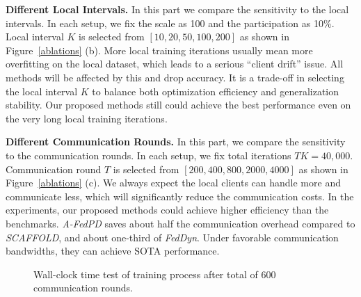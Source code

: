 \textbf{Different Local Intervals.} In this part we compare the sensitivity to the local intervals. In each setup, we fix the scale as 100 and the participation as 10\%. Local interval $K$ is selected from $\left[10, 20, 50, 100, 200\right]$ as shown in Figure~\ref{ablations} (b). More local training iterations usually mean more overfitting on the local dataset, which leads to a serious ``client drift'' issue. All methods will be affected by this and drop accuracy. It is a trade-off in selecting the local interval $K$ to balance both optimization efficiency and generalization stability. Our proposed methods still could achieve the best performance even on the very long local training iterations.

\textbf{Different Communication Rounds.} In this part, we compare the sensitivity to the communication rounds. In each setup, we fix total iterations $TK = 40,000$. Communication round $T$ is selected from $\left[200, 400, 800, 2000, 4000\right]$ as shown in Figure~\ref{ablations} (c). We always expect the local clients can handle more and communicate less, which will significantly reduce the communication costs. In the experiments, our proposed methods could achieve higher efficiency than the benchmarks. \textit{A-FedPD} saves about half the communication overhead compared to \textit{SCAFFOLD}, and about one-third of \textit{FedDyn}. Under favorable communication bandwidths, they can achieve SOTA performance.

\begin{figure}
\centering
\vspace{-0.6cm}
    \!\!\!
 \vskip -0.1in
\caption{Wall-clock time test of training process after total of 600 communication rounds.}
\label{wall clock time}
 \vskip -0.1in
\end{figure}

